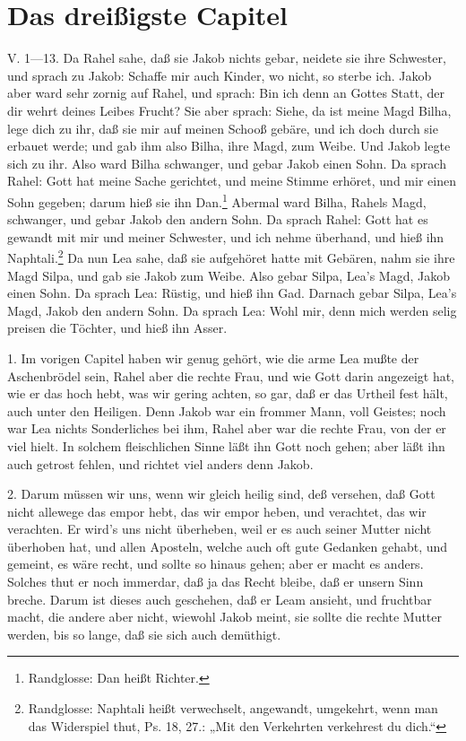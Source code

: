 \section{Das dreißigste Capitel}
V. 1—13. Da Rahel sahe, daß sie Jakob nichts gebar, neidete sie ihre Schwester, und sprach zu Jakob: Schaffe mir auch Kinder, wo nicht, so sterbe ich. Jakob aber ward sehr zornig auf Rahel, und sprach: Bin ich denn an Gottes Statt, der dir wehrt deines Leibes Frucht? Sie aber sprach: Siehe, da ist meine Magd Bilha, lege dich zu ihr, daß sie mir auf meinen Schooß gebäre, und ich doch durch sie erbauet werde; und gab ihm also Bilha, ihre Magd, zum Weibe. Und Jakob legte sich zu ihr. Also ward Bilha schwanger, und gebar Jakob einen Sohn. Da sprach Rahel: Gott hat meine Sache gerichtet, und meine Stimme erhöret, und mir einen Sohn gegeben; darum hieß sie ihn Dan.\footnote{Randglosse: Dan heißt Richter.} Abermal ward Bilha, Rahels Magd, schwanger, und gebar Jakob den andern Sohn. Da sprach Rahel: Gott hat es gewandt mit mir und meiner Schwester, und ich nehme überhand, und hieß ihn Naphtali.\footnote{Randglosse: Naphtali heißt verwechselt, angewandt, umgekehrt, wenn man das Widerspiel thut, Ps. 18, 27.: „Mit den Verkehrten verkehrest du dich.“} Da nun Lea sahe, daß sie aufgehöret hatte mit Gebären, nahm sie ihre Magd Silpa, und gab sie Jakob zum Weibe. Also gebar Silpa, Lea’s Magd, Jakob einen Sohn. Da sprach Lea: Rüstig, und hieß ihn Gad. Darnach gebar Silpa, Lea’s Magd, Jakob den andern Sohn. Da sprach Lea: Wohl mir, denn mich werden selig preisen die Töchter, und hieß ihn Asser.

1. Im vorigen Capitel haben wir genug gehört, wie die arme Lea mußte der Aschenbrödel sein, Rahel aber die rechte Frau, und wie Gott darin angezeigt hat, wie er das hoch hebt, was wir gering achten, so gar, daß er das Urtheil fest hält, auch unter den Heiligen. Denn Jakob war ein frommer Mann, voll Geistes; noch war Lea nichts Sonderliches bei ihm, Rahel aber war die rechte Frau, von der er viel hielt. In solchem fleischlichen Sinne läßt ihn Gott noch gehen; aber läßt ihn auch getrost fehlen, und richtet viel anders denn Jakob.

2. Darum müssen wir uns, wenn wir gleich heilig sind, deß versehen, daß Gott nicht allewege das empor hebt, das wir empor heben, und verachtet, das wir verachten. Er wird’s uns nicht überheben, weil er es auch seiner Mutter nicht überhoben hat, und allen Aposteln, welche auch oft gute Gedanken gehabt, und gemeint, es wäre recht, und sollte so hinaus gehen; aber er macht es anders. Solches thut er noch immerdar, daß ja das Recht bleibe, daß er unsern Sinn breche. Darum ist dieses auch geschehen, daß er Leam ansieht, und fruchtbar macht, die andere aber nicht, wiewohl Jakob meint, sie sollte die rechte Mutter werden, bis so lange, daß sie sich auch demüthigt.

